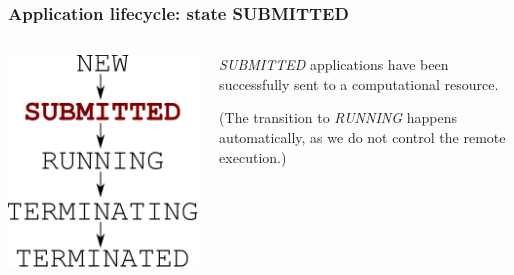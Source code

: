 \documentclass[english,serif,mathserif,xcolor=pdftex,dvipsnames,table]{beamer}
\begin{document}
\begin{frame}[fragile]
\frametitle{Application lifecycle: state SUBMITTED}
\begin{columns}[c]
  \begin{column}{0.5\textwidth}
    \includegraphics[height=0.7\textheight]{fig/state-SUBMITTED}
  \end{column}
  \begin{column}{0.4\textwidth}
    \raggedleft

    \emph{SUBMITTED} applications have been successfully sent to a
    computational resource.

    \+ 
    (The transition to \emph{RUNNING} happens automatically, as we
    do not control the remote execution.)
  \end{column}
\end{columns}
\end{frame}
\end{document}
